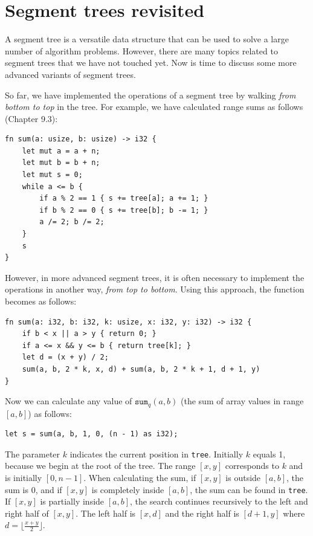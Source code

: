 \chapter{Segment trees revisited}


A segment tree is a versatile data structure
that can be used to solve a large number of algorithm problems.
However, there are many topics related to segment trees
that we have not touched yet.
Now is time to discuss some more advanced variants
of segment trees.

So far, we have implemented the operations
of a segment tree by walking \emph{from bottom to top}
in the tree.
For example, we have calculated
range sums as follows (Chapter 9.3):

\begin{lstlisting}
fn sum(a: usize, b: usize) -> i32 {
    let mut a = a + n;
    let mut b = b + n;
    let mut s = 0;
    while a <= b {
        if a % 2 == 1 { s += tree[a]; a += 1; }
        if b % 2 == 0 { s += tree[b]; b -= 1; }
        a /= 2; b /= 2;
    }
    s
}
\end{lstlisting}

However, in more advanced segment trees,
it is often necessary to implement the operations
in another way, \emph{from top to bottom}.
Using this approach, the function becomes as follows:
\begin{lstlisting}
fn sum(a: i32, b: i32, k: usize, x: i32, y: i32) -> i32 {
    if b < x || a > y { return 0; }
    if a <= x && y <= b { return tree[k]; }
    let d = (x + y) / 2;
    sum(a, b, 2 * k, x, d) + sum(a, b, 2 * k + 1, d + 1, y)
}
\end{lstlisting}

Now we can calculate any value of $\texttt{sum}_q(a,b)$
(the sum of array values in range $[a,b]$) as follows:
\begin{lstlisting}
let s = sum(a, b, 1, 0, (n - 1) as i32);
\end{lstlisting}

The parameter $k$ indicates the current position
in \texttt{tree}.
Initially $k$ equals 1, because we begin
at the root of the tree.
The range $[x,y]$ corresponds to $k$
and is initially $[0,n-1]$.
When calculating the sum,
if $[x,y]$ is outside $[a,b]$,
the sum is 0,
and if $[x,y]$ is completely inside $[a,b]$,
the sum can be found in \texttt{tree}.
If $[x,y]$ is partially inside $[a,b]$,
the search continues recursively to the
left and right half of $[x,y]$.
The left half is $[x,d]$
and the right half is $[d+1,y]$
where $d=\lfloor \frac{x+y}{2} \rfloor$.


